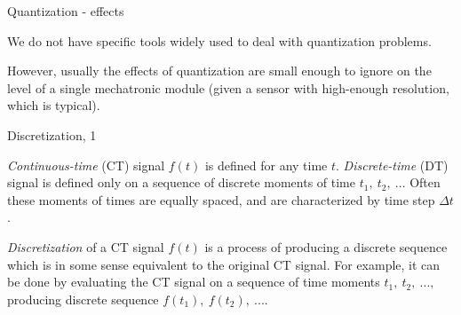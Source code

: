\documentclass{beamer}
\begin{document}
\begin{frame}{Quantization - effects}
	\begin{flushleft}
		
		We do not have specific tools widely used to deal with quantization problems. 
		
		\bigskip
		
		However, usually the effects of quantization are small enough to ignore on the level of a single mechatronic module (given a sensor with high-enough resolution, which is typical).  
		
	\end{flushleft}
\end{frame}



\begin{frame}{Discretization, 1}
	\begin{flushleft}
		
		\emph{Continuous-time} (CT) signal $f(t)$ is defined for any time $t$. \emph{Discrete-time} (DT) signal is defined only on a sequence of discrete moments of time $t_1, \ t_2, \ ...$ Often these moments of times are equally spaced, and are characterized by time step $\Delta t$.
		
		\bigskip
		
		\emph{Discretization} of a CT signal $f(t)$ is a process of producing a discrete sequence which is in some sense equivalent to the original CT signal. For example, it can be done by evaluating the CT signal on a sequence of time moments $t_1, \ t_2, \ ...,$ producing discrete sequence $f(t_1), \ f(t_2),  \ ...$.
		
	\end{flushleft}
\end{frame}
\end{document}
